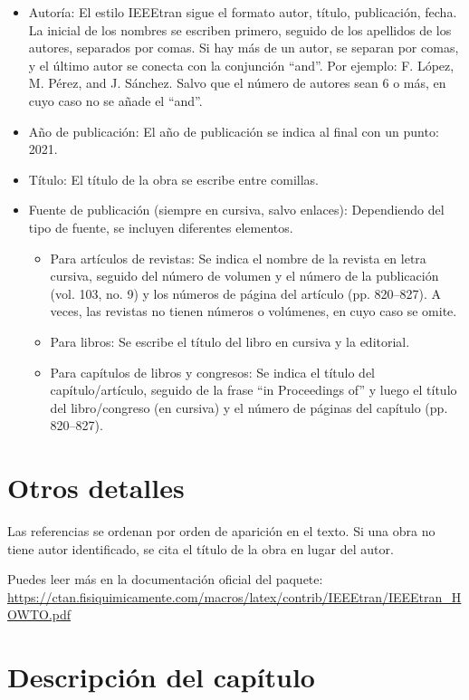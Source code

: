 \begin{itemize}
\item Autoría: El estilo IEEEtran sigue el formato autor, título, publicación, fecha. La inicial de los nombres se escriben primero, seguido de los apellidos de los autores, separados por comas. Si hay más de un autor, se separan por comas, y el último autor se conecta con la conjunción ``and''. Por ejemplo: F. López, M. Pérez, and J. Sánchez. Salvo que el número de autores sean 6 o más, en cuyo caso no se añade el ``and''.
\item Año de publicación: El año de publicación se indica al final con un punto: 2021.
\item Título: El título de la obra se escribe entre comillas.
\item Fuente de publicación (siempre en cursiva, salvo enlaces): Dependiendo del tipo de fuente, se incluyen diferentes elementos.

    \begin{itemize}
    \item Para artículos de revistas: Se indica el nombre de la revista en letra cursiva, seguido del número de volumen y el número de la publicación (vol. 103, no. 9) y los números de página del artículo (pp. 820--827). A veces, las revistas no tienen números o volúmenes, en cuyo caso se omite.
    \item Para libros: Se escribe el título del libro en cursiva y la editorial.
    \item Para capítulos de libros y congresos: Se indica el título del capítulo/artículo, seguido de la frase ``in Proceedings of'' y luego el título del libro/congreso (en cursiva) y el número de páginas del capítulo (pp. 820--827).
    \end{itemize}
\end{itemize}

\section{Otros detalles}

Las referencias se ordenan por orden de aparición en el texto. Si una obra no tiene autor identificado, se cita el título de la obra en lugar del autor.

Puedes leer más en la documentación oficial del paquete:
\url{https://ctan.fisiquimicamente.com/macros/latex/contrib/IEEEtran/IEEEtran_HOWTO.pdf}

\section{Descripción del capítulo}

